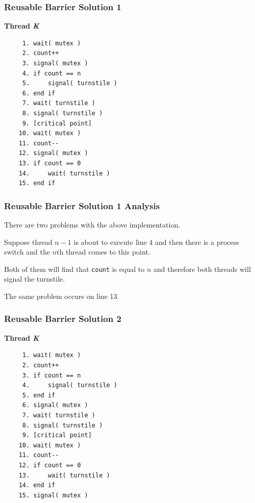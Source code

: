 \begin{frame}[fragile]
\frametitle{Reusable Barrier Solution 1}

\textbf{Thread \textit{K}}\vspace{-2em}
  \begin{verbatim}
	 1. wait( mutex )
	 2. count++
	 3. signal( mutex )
	 4. if count == n
	 5.     signal( turnstile )
	 6. end if
	 7. wait( turnstile )
	 8. signal( turnstile )
	 9. [critical point]
	10. wait( mutex )
	11. count--
	12. signal( mutex )
	13. if count == 0
	14.     wait( turnstile )
	15. end if
  \end{verbatim}
\vspace{-2em}

\end{frame}

\begin{frame}
\frametitle{Reusable Barrier Solution 1 Analysis}

There are two problems with the above implementation. 

Suppose thread $n-1$ is about to execute line 4 and then there is a process switch and the $n$th thread comes to this point. 

Both of them will find that \texttt{count} is equal to $n$ and therefore both threads will signal the turnstile. 

The same problem occurs on line 13.


\end{frame}

\begin{frame}[fragile]
\frametitle{Reusable Barrier Solution 2}

\textbf{Thread \textit{K}}\vspace{-2em}
  \begin{verbatim}
	 1. wait( mutex )
	 2. count++
	 3. if count == n
	 4.     signal( turnstile )
	 5. end if
	 6. signal( mutex )
	 7. wait( turnstile )
	 8. signal( turnstile )
	 9. [critical point]
	10. wait( mutex )
	11. count--
	12. if count == 0
	13.     wait( turnstile )
	14. end if
	15. signal( mutex )
  \end{verbatim}
\vspace{-2em}

\end{frame}


